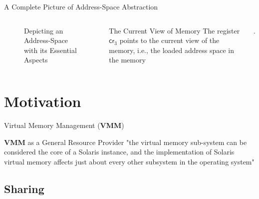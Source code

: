 \documentclass[aspectratio=169,xcolor=dvipsnames]{beamer}
\begin{document}
\begin{frame}{A Complete Picture of Address-Space Abstraction}
\begin{columns}[c]
\begin{figure}
\begin{tikzpicture}[x=0.75pt,y=0.75pt,yscale=-0.7,xscale=0.7]
\end{tikzpicture}
    \caption{Depicting an Address-Space with its Essential Aspects}
    \label{fig:enter-label}
\end{figure}
  \begin{block}{The Current View of Memory}
    The register $\mathsf{cr}_3$ points to the current view of the memory, i.e., the loaded address space in the memory \end{block}.
\end{columns}

\end{frame}

\section{Motivation}
\begin{frame}{Virtual Memory Management (\textbf{VMM})}
    \begin{block}{\textbf{VMM} as a General Resource Provider}
    "the virtual memory sub-system can be considered the core of a Solaris instance, and the implementation of Solaris virtual memory affects just about every other subsystem in the operating system" \cite{mcdougall2006solaris}
    \end{block}
\end{frame}

\subsection{Sharing}
\end{document}
